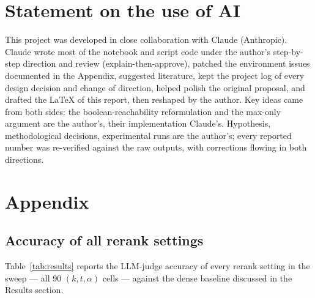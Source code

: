 \documentclass{article}
\begin{document}
\section*{Statement on the use of AI}
This project was developed in close collaboration with Claude (Anthropic). Claude wrote most of the notebook and script code under the author's step-by-step direction and review (explain-then-approve), patched the environment issues documented in the Appendix, suggested literature, kept the project log of every design decision and change of direction, helped polish the original proposal, and drafted the LaTeX of this report, then reshaped by the author. Key ideas came from both sides: the boolean-reachability reformulation and the max-only argument are the author's, their implementation Claude's. Hypothesis, methodological decisions, experimental runs are the author's; every reported number was re-verified against the raw outputs, with corrections flowing in both directions.

\nocite{naveed2024comprehensiveoverviewlargelanguage,peng2024graphretrievalaugmentedgenerationsurvey}



\appendix

\section*{Appendix}

\subsection*{Accuracy of all rerank settings}
Table~\ref{tab:results} reports the LLM-judge accuracy of every rerank setting in the sweep --- all 90 $(k, t, \alpha)$ cells --- against the dense baseline discussed in the Results section.
\end{document}
